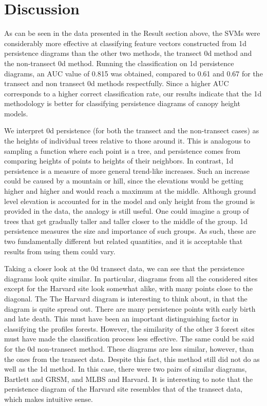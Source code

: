\documentclass[10pt]{article}
\begin{document}
\section*{Discussion}
\indent As can be seen in the data presented in the Result section above, the SVMs were considerably more effective at classifying feature vectors constructed from 1d persistence diagrams than the other two methods, the transect 0d method and the non-transect 0d method. Running the classification on 1d persistence diagrams, an AUC value of 0.815 was obtained, compared to 0.61 and 0.67 for the transect and non transect 0d methods respectfully. Since a higher AUC corresponds to a higher correct classification rate, our results indicate that the 1d methodology is better for classifying persistence diagrams of canopy height models. 

\indent We interpret 0d persistence (for both the transect and the non-transect cases) as the heights of individual trees relative to those around it. This is analogous to sampling a function where each point is a tree, and persistence comes from comparing heights of points to heights of their neighbors. In contrast, 1d persistence is a measure of more general trend-like increases. Such an increase could be caused by a mountain or hill, since the elevations would be getting higher and higher and would reach a maximum at the middle. Although ground level elevation is accounted for in the model and only height from the ground is provided in the data, the analogy is still useful. One could imagine a group of trees that get gradually taller and taller closer to the middle of the group. 1d persistence measures the size and importance of such groups. As such, these are two fundamentally different but related quantities, and it is acceptable that results from using them could vary.

\indent Taking a closer look at the 0d transect data, we can see that the persistence diagrams look quite similar. In particular, diagrams from all the considered sites except for the Harvard site look somewhat alike, with many points close to the diagonal. The The Harvard diagram is interesting to think about, in that the diagram is quite spread out. There are many persistence points with early birth and late death. This must have been an important distinguishing factor in classifying the profiles forests. However, the similarity of the other 3 forest sites must have made the classification process less effective. The same could be said for the 0d non-transect method. These diagrams are less similar, however, than the ones from the transect data. Despite this fact, this method still did not do as well as the 1d method. In this case, there were two pairs of similar diagrams, Bartlett and GRSM, and MLBS and Harvard. It is interesting to note that the persistence diagram of the Harvard site resembles that of the transect data, which makes intuitive sense.
\end{document}

